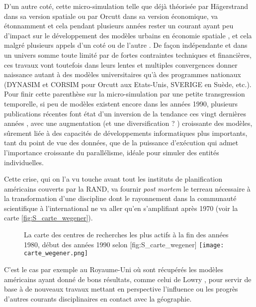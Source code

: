 D'un autre coté, cette micro-simulation telle que déjà théorisée par Hägerstrand dans sa version spatiale ou par Orcutt dans sa version économique, va étonnamment et cela pendant plusieurs années rester un courant ayant peu d'impact sur le développement des modèles urbains en économie spatiale \autocite[5]{Sanders2006}, et cela malgré plusieurs appels d'un coté \autocite{Hagerstrand1970} ou de l'autre \autocite[5]{Isard1998}. De façon indépendante et dans un univers somme toute limité par de fortes contraintes techniques et financières, ces travaux vont toutefois dans leurs lentes et multiples convergences donner naissance autant à des modèles universitaires qu'à des programmes nationaux (DYNASIM et CORSIM pour Orcutt aux Etats-Unis, SVERIGE en Suède, etc.). Pour finir cette parenthèse sur la micro-simulation par une petite transgression temporelle, si peu de modèles existent encore dans les années 1990, plusieurs publications récentes font état d'un inversion de la tendance ces vingt dernières années \autocite{Lenormand2013}, avec une augmentation (et une diversification ? ) croissante des modèles, sûrement liée à des capacités de développements informatiques plus importants, tant du point de vue des données, que de la puissance d’exécution qui admet l'importance croissante du parallélisme, idéale pour simuler des entités individuelles. \autocites[5]{Sanders2006}{Lenormand2013}

Cette crise, qui on l'a vu touche avant tout les instituts de planification américains couverts par la RAND, va fournir \textit{post mortem} le terreau nécessaire à la transformation d'une discipline dont le rayonnement dans la communauté scientifique à l'international ne va aller qu'en s'amplifiant après 1970 (voir la carte \ref{fig:S_carte_wegener}).

\begin{figure}[h]
\begin{sidecaption}[fortoc]{La carte des centres de recherches les plus actifs à la fin des années 1980, début des années 1990 selon \textcite{Wegener1994}}[fig:S_carte_wegener]
  \centering
 \texttt{[image: carte\_wegener.png]}
  \end{sidecaption}
\end{figure}

C'est le cas par exemple au Royaume-Uni où sont récupérés les modèles américains ayant donné de bons résultats, comme celui de Lowry \autocite{Lowry1964}, pour servir de base à de nouveaux travaux mettant en perspective l'influence ou les progrès d'autres courants disciplinaires en contact avec la géographie. 

